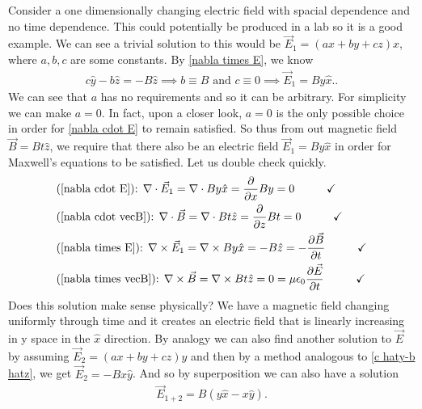 Consider a one dimensionally changing electric field with spacial dependence and no time dependence. This could potentially be produced in a lab so it is a good example. We can see a trivial solution to this would be $\vec{E}_1 = (ax+by+cz) \hat{x}$, where $a,b,c$ are some constants. By \ref{nabla times E}, we know 
\begin{align}
	c \hat{y}-b \hat{z} = -B \hat{z} \implies b \equiv B \textrm{ and } c \equiv 0 \implies \vec{E}_1 = B y\hat{x}. \label{c haty-b hatz}.
\end{align}
We can see that $a$ has no requirements and so it can be arbitrary. For simplicity we can make $a=0$. In fact, upon a closer look, $a=0$ is the only possible choice in order for \ref{nabla cdot E} to remain satisfied. So thus from out magnetic field $\vec{B} = Bt\hat{z}$, we require that there also be an electric field $\vec{E}_1=By \hat{x}$ in order for Maxwell's equations to be satisfied. Let us double check quickly. 
\begin{align}
	&\textrm{(\ref{nabla cdot E}): }\nabla \cdot \vec{E}_1 = \nabla \cdot By \hat{x} = \frac{\partial}{\partial x} By = 0 \hspace{1cm} \checkmark \\
	&\textrm{(\ref{nabla cdot vecB}): } \nabla \cdot \vec{B} = \nabla \cdot Bt \hat{z} = \frac{\partial}{\partial z} Bt = 0 \hspace{1cm} \checkmark \\
	&\textrm{(\ref{nabla times E}): } \nabla \times \vec{E}_1 = \nabla \times B y \hat{x} = -B \hat{z} = -\frac{\partial \vec{B}}{\partial t}   \hspace{1cm} \checkmark \\
	&\textrm{(\ref{nabla times vecB}): } \nabla \times \vec{B} = \nabla \times Bt\hat{z} = 0 = \mu\epsilon_0\frac{\partial \vec{E}}{\partial t}\hspace{1cm} \checkmark 
\end{align}
Does this solution make sense physically? We have a magnetic field changing uniformly through time and it creates an electric field that is linearly increasing in y space in the $\hat{x}$ direction. By analogy we can also find another solution to $\vec{E}$ by assuming $\vec{E}_2 = (ax+by+cz)\hat{y}$ and then by a method analogous to \ref{c haty-b hatz}, we get $\vec{E}_2 = -Bx\hat{y}$. And so by superposition we can also have a solution
\begin{align}
	\vec{E}_{1+2} = B(y \hat{x}-x\hat{y}). \label{zeeman_superposition_solution}
\end{align}

